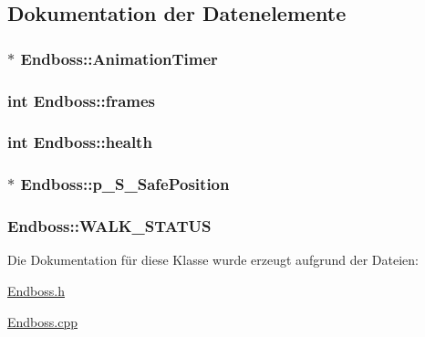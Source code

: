 \subsection{Dokumentation der Datenelemente}
\hypertarget{class_endboss_a0280ead12bf56a95debcdef1d87c0d04}{
\subsubsection[{Animation\-Timer}]{$\ast$ Endboss\-::\-Animation\-Timer\hspace{0.3cm}{\ttfamily [private]}}}\label{class_endboss_a0280ead12bf56a95debcdef1d87c0d04}
\hypertarget{class_endboss_ab560e5e3969e1b6e4729b06b7b1937f0}{
\subsubsection[{frames}]{\setlength{\rightskip}{0pt plus 5cm}int Endboss\-::frames\hspace{0.3cm}{\ttfamily [private]}}}\label{class_endboss_ab560e5e3969e1b6e4729b06b7b1937f0}
\hypertarget{class_endboss_a7d1bc83efe94e4627126acdcbcee88a7}{
\subsubsection[{health}]{\setlength{\rightskip}{0pt plus 5cm}int Endboss\-::health\hspace{0.3cm}{\ttfamily [private]}}}\label{class_endboss_a7d1bc83efe94e4627126acdcbcee88a7}
\hypertarget{class_endboss_a0fdcc8270b5ba6a912c0e171feb5cbd8}{
\subsubsection[{p\-\_\-\-S\-\_\-\-Safe\-Position}]{$\ast$ Endboss\-::p\-\_\-\-S\-\_\-\-Safe\-Position\hspace{0.3cm}{\ttfamily [private]}}}\label{class_endboss_a0fdcc8270b5ba6a912c0e171feb5cbd8}
\hypertarget{class_endboss_a1ab1132e4f6a9601b4b1b6e5905ac2a6}{
\subsubsection[{W\-A\-L\-K\-\_\-\-S\-T\-A\-T\-U\-S}]{ Endboss\-::\-W\-A\-L\-K\-\_\-\-S\-T\-A\-T\-U\-S\hspace{0.3cm}{\ttfamily [private]}}}\label{class_endboss_a1ab1132e4f6a9601b4b1b6e5905ac2a6}


Die Dokumentation für diese Klasse wurde erzeugt aufgrund der Dateien\-:\begin{DoxyCompactItemize}
\item 
\hyperlink{_endboss_8h}{Endboss.\-h}\item 
\hyperlink{_endboss_8cpp}{Endboss.\-cpp}\end{DoxyCompactItemize}
